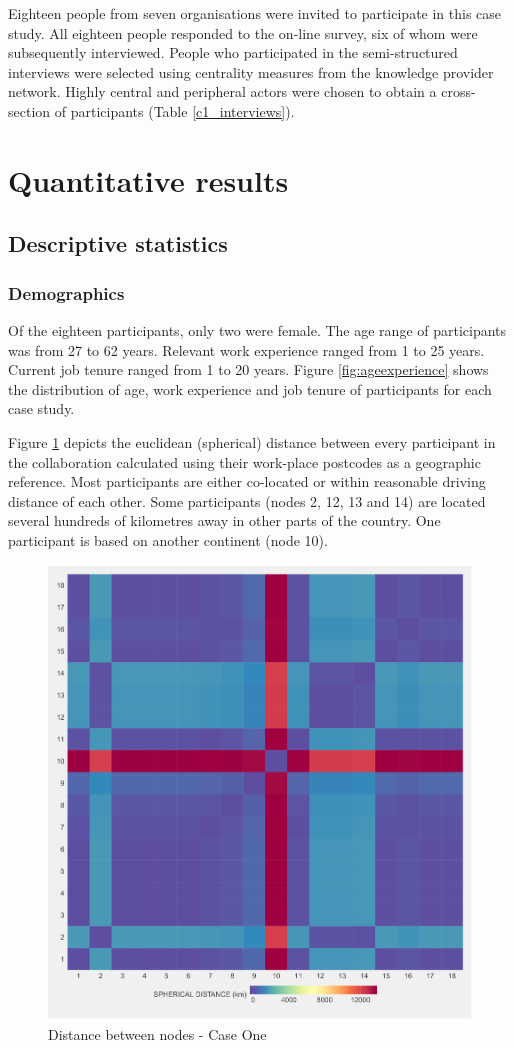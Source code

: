
Eighteen people from seven organisations were invited to participate in this case study. All eighteen people responded to the on-line survey, six of whom were subsequently interviewed. People who participated in the semi-structured interviews were selected using centrality measures from the knowledge provider network. Highly central and peripheral actors were chosen to obtain a cross-section of participants (Table \ref{c1_interviews}). 

\section{Quantitative results}
 
\subsection{Descriptive statistics}

\subsubsection{Demographics}

Of the eighteen participants, only two were female. The age range of participants was from 27 to 62 years. Relevant work experience ranged from 1 to 25 years. Current job tenure ranged from 1 to 20 years. Figure \ref{fig:ageexperience} shows the distribution of age, work experience and job tenure of participants for each case study. \medskip

Figure \ref{fig:sphdistancecase1} depicts the euclidean (spherical) distance between every participant in the collaboration calculated using their work-place postcodes as a geographic reference. Most participants are either co-located or within reasonable driving distance of each other. Some participants (nodes 2, 12, 13 and 14) are located several hundreds of kilometres away in other parts of the country. One participant is based on another continent (node 10).\medskip

\begin{figure}
	\centering
	\includegraphics[width=0.7\linewidth]{Images/sph_distance_case1}
	\caption{Distance between nodes - Case One}
	\label{fig:sphdistancecase1}
\end{figure}

